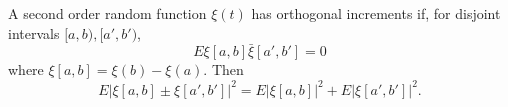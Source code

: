 A second order random function $\xi(t)$ has orthogonal increments if, for disjoint intervals $[a, b), [a', b')$, $$E \xi[a, b] \bar{\xi}[a', b'] = 0$$ where $\xi[a, b] = \xi(b) - \xi(a)$. Then $$E |\xi[a, b] \pm \xi[a', b']|^2 = E |\xi[a, b]|^2 + E |\xi[a', b']|^2.$$
